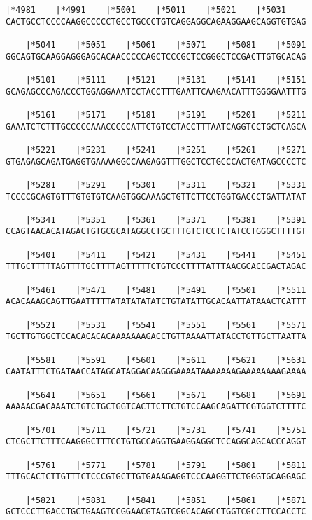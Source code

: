 \documentclass{article}
\begin{document}
\begin{Verbatim}[fontfamily=courier]
    |*4981    |*4991    |*5001    |*5011    |*5021    |*5031
CACTGCCTCCCCAAGGCCCCCTGCCTGCCCTGTCAGGAGGCAGAAGGAAGCAGGTGTGAG

    |*5041    |*5051    |*5061    |*5071    |*5081    |*5091
GGCAGTGCAAGGAGGGAGCACAACCCCCAGCTCCCGCTCCGGGCTCCGACTTGTGCACAG

    |*5101    |*5111    |*5121    |*5131    |*5141    |*5151
GCAGAGCCCAGACCCTGGAGGAAATCCTACCTTTGAATTCAAGAACATTTGGGGAATTTG

    |*5161    |*5171    |*5181    |*5191    |*5201    |*5211
GAAATCTCTTTGCCCCCAAACCCCCATTCTGTCCTACCTTTAATCAGGTCCTGCTCAGCA

    |*5221    |*5231    |*5241    |*5251    |*5261    |*5271
GTGAGAGCAGATGAGGTGAAAAGGCCAAGAGGTTTGGCTCCTGCCCACTGATAGCCCCTC

    |*5281    |*5291    |*5301    |*5311    |*5321    |*5331
TCCCCGCAGTGTTTGTGTGTCAAGTGGCAAAGCTGTTCTTCCTGGTGACCCTGATTATAT

    |*5341    |*5351    |*5361    |*5371    |*5381    |*5391
CCAGTAACACATAGACTGTGCGCATAGGCCTGCTTTGTCTCCTCTATCCTGGGCTTTTGT

    |*5401    |*5411    |*5421    |*5431    |*5441    |*5451
TTTGCTTTTTAGTTTTGCTTTTAGTTTTTCTGTCCCTTTTATTTAACGCACCGACTAGAC

    |*5461    |*5471    |*5481    |*5491    |*5501    |*5511
ACACAAAGCAGTTGAATTTTTATATATATATCTGTATATTGCACAATTATAAACTCATTT

    |*5521    |*5531    |*5541    |*5551    |*5561    |*5571
TGCTTGTGGCTCCACACACACAAAAAAAGACCTGTTAAAATTATACCTGTTGCTTAATTA

    |*5581    |*5591    |*5601    |*5611    |*5621    |*5631
CAATATTTCTGATAACCATAGCATAGGACAAGGGAAAATAAAAAAAGAAAAAAAAGAAAA

    |*5641    |*5651    |*5661    |*5671    |*5681    |*5691
AAAAACGACAAATCTGTCTGCTGGTCACTTCTTCTGTCCAAGCAGATTCGTGGTCTTTTC

    |*5701    |*5711    |*5721    |*5731    |*5741    |*5751
CTCGCTTCTTTCAAGGGCTTTCCTGTGCCAGGTGAAGGAGGCTCCAGGCAGCACCCAGGT

    |*5761    |*5771    |*5781    |*5791    |*5801    |*5811
TTTGCACTCTTGTTTCTCCCGTGCTTGTGAAAGAGGTCCCAAGGTTCTGGGTGCAGGAGC

    |*5821    |*5831    |*5841    |*5851    |*5861    |*5871
GCTCCCTTGACCTGCTGAAGTCCGGAACGTAGTCGGCACAGCCTGGTCGCCTTCCACCTC

\end{Verbatim}
\newpage
\end{document}
